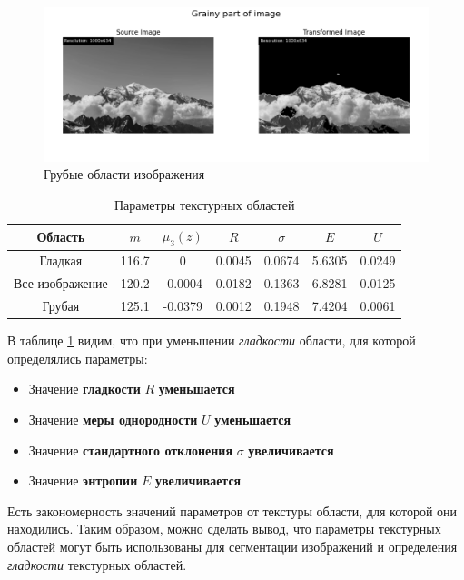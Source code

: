 \begin{figure}[ht!]
    \centering
    \includegraphics[width=\textwidth]{../results/Grainy part of image.png}
    \caption{Грубые области изображения}
    \label{img:rough}
\end{figure}

\begin{table}[ht!]
    \centering
    \begin{tabular}{|c|c|c|c|c|c|c|}
        \hline
        Область & $m$ & $\mu_3(z)$ & $R$ & $\sigma$ & $E$ & $U$ \\
        \hline
        Гладкая &  116.7 & 0 & 0.0045 & 0.0674 & 5.6305 & 0.0249\\
        \hline
        Все изображение & 120.2 & -0.0004 &  0.0182 & 0.1363 & 6.8281 & 0.0125 \\
        \hline
        Грубая &  125.1 & -0.0379 & 0.0012 & 0.1948 & 7.4204 & 0.0061\\
        \hline
    \end{tabular}
    \caption{Параметры текстурных областей}
    \label{tab:texture_params}
\end{table}

\FloatBarrier
В таблице \ref{tab:texture_params} видим, что при уменьшении \textit{гладкости} области, для которой определялись параметры: 
\begin{itemize}
    \item Значение \textbf{гладкости} $R$ \textbf{уменьшается}
    \item Значение \textbf{меры однородности} $U$ \textbf{уменьшается}
    \item Значение \textbf{стандартного отклонения} $\sigma$ \textbf{увеличивается}
    \item Значение \textbf{энтропии} $E$ \textbf{увеличивается}
\end{itemize}

Есть закономерность значений параметров от текстуры области, для которой они находились. 
Таким образом, можно сделать вывод, что параметры текстурных областей могут быть использованы для сегментации изображений 
и определения \textit{гладкости} текстурных областей.
